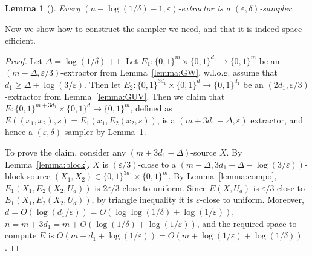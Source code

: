 \documentclass[10pt,a4paper]{article}
\newtheorem{lemma}[theorem]{Lemma}
\newcommand{\bits}[1]{\{0,1\}^{#1}}
\newcommand{\eps}{\varepsilon}
\begin{document}
\begin{lemma}[\cite{Zuc97}]\label{lemma:Zuc}
Every $(n-\log(1/\delta)-1,\eps)$-extractor is a $(\eps,\delta)$-sampler.
\end{lemma}
\noindent
Now we show how to construct the sampler we need, and that it is indeed space efficient.
\begin{proof}
Let $\Delta=\log(1/\delta)+1$. Let $E_1:\bits{m}\times\bits{d_1}\to\bits{m}$ be an $(m-\Delta,\eps/3)$-extractor from Lemma~\ref{lemma:GW}, w.l.o.g. assume that $d_1\ge \Delta+\log(3/\eps)$. Then let $E_2:\bits{3d_1}\times\bits{d}\to\bits{d_1}$ be an $(2d_1,\eps/3)$-extractor from Lemma~\ref{lemma:GUV}. Then we claim that $E:\bits{m+3d_1}\times\bits{d}\to\bits{m}$, defined as $E((x_1,x_2),s)=E_1(x_1,E_2(x_2,s))$, is a $(m+3d_1-\Delta,\eps)$ extractor, and hence a $(\eps,\delta)$ sampler by Lemma~\ref{lemma:Zuc}. 

To prove the claim, consider any $(m+3d_1-\Delta)$-source $X$. By Lemma~\ref{lemma:block}, $X$ is $(\eps/3)$-close to a $(m-\Delta,3d_1-\Delta-\log(3/\eps))$-block source $(X_1,X_2)\in\bits{3d_1}\times\bits{m}$. By Lemma~\ref{lemma:compo}, $E_1(X_1,E_2(X_2,U_d))$ is $2\eps/3$-close to uniform. Since $E(X,U_d)$ is $\eps/3$-close to $E_1(X_1,E_2(X_2,U_d))$, by triangle inequality it is $\eps$-close to uniform. Moreover, $d=O(\log (d_1/\eps))=O(\log\log(1/\delta)+\log(1/\eps))$, $n=m+3d_1=m+O(\log(1/\delta)+\log(1/\eps))$, and the required space to compute $E$ is $O(m+d_1+\log(1/\eps))=O(m+\log(1/\eps)+\log(1/\delta))$.
\end{proof}
\end{document}
